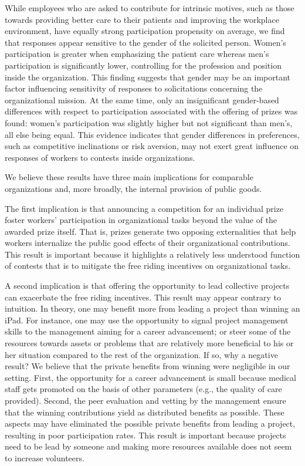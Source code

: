\documentclass[11pt, titlepage]{article}
\begin{document}
While employees who are asked to contribute for intrinsic motives, such
as those towards providing better care to their patients and improving
the workplace environment, have equally strong participation propensity
on average, we find that responses appear sensitive to the gender of the
solicited person. Women's participation is greater when emphasizing the
patient care whereas men's participation is significantly lower,
controlling for the profession and position inside the organization.
This finding suggests that gender may be an important factor influencing
sensitivity of responses to solicitations concerning the organizational
mission. At the same time, only an insignificant gender-based
differences with respect to participation associated with the offering
of prizes was found: women's participation was slightly higher but not
significant than men's, all else being equal. This evidence indicates
that gender differences in preferences, such as competitive inclinations
or risk aversion, may not exert great influence on responses of workers
to contests inside organizations.

We believe these results have three main implications for comparable
organizations and, more broadly, the internal provision of public goods.

The first implication is that announcing a competition for an individual
prize foster workers' participation in organizational tasks beyond the
value of the awarded prize itself. That is, prizes generate two opposing
externalities that help workers internalize the public good effects of
their organizational contributions. This result is important because it
highlights a relatively less understood function of contests that is to
mitigate the free riding incentives on organizational tasks.

A second implication is that offering the opportunity to lead collective
projects can exacerbate the free riding incentives. This result may
appear contrary to intuition. In theory, one may benefit more from
leading a project than winning an iPad. For instance, one may use the
opportunity to signal project management skills to the management aiming
for a career advancement; or steer some of the resources towards assets
or problems that are relatively more beneficial to his or her situation
compared to the rest of the organization. If so, why a negative result?
We believe that the private benefits from winning were negligible in our
setting. First, the opportunity for a career advancement is small
because medical staff gets promoted on the basis of other parameters
(e.g., the quality of care provided). Second, the peer evaluation and
vetting by the management ensure that the winning contributions yield as
distributed benefits as possible. These aspects may have eliminated the
possible private benefits from leading a project, resulting in poor
participation rates. This result is important because projects need to
be lead by someone and making more resources available does not seem to
increase volunteers.
\end{document}
